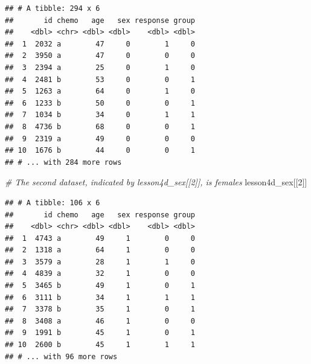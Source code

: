 \documentclass[]{book}
\newenvironment{Shaded}{\begin{snugshade}}{\end{snugshade}}
\newcommand{\CommentTok}[1]{\textcolor[rgb]{0.56,0.35,0.01}{\textit{#1}}}
\newcommand{\DataTypeTok}[1]{\textcolor[rgb]{0.13,0.29,0.53}{#1}}
\newcommand{\DecValTok}[1]{\textcolor[rgb]{0.00,0.00,0.81}{#1}}
\newcommand{\KeywordTok}[1]{\textcolor[rgb]{0.13,0.29,0.53}{\textbf{#1}}}
\newcommand{\NormalTok}[1]{#1}
\newcommand{\OperatorTok}[1]{\textcolor[rgb]{0.81,0.36,0.00}{\textbf{#1}}}
\begin{document}
\begin{verbatim}
## # A tibble: 294 x 6
##       id chemo   age   sex response group
##    <dbl> <chr> <dbl> <dbl>    <dbl> <dbl>
##  1  2032 a        47     0        1     0
##  2  3950 a        47     0        0     0
##  3  2394 a        25     0        1     0
##  4  2481 b        53     0        0     1
##  5  1263 a        64     0        1     0
##  6  1233 b        50     0        0     1
##  7  1034 b        34     0        1     1
##  8  4736 b        68     0        0     1
##  9  2319 a        49     0        0     0
## 10  1676 b        44     0        0     1
## # ... with 284 more rows
\end{verbatim}

\begin{Shaded}
\begin{Highlighting}[]
\CommentTok{# The second dataset, indicated by lesson4d_sex[[2]], is females}
\NormalTok{lesson4d_sex[[}\DecValTok{2}\NormalTok{]]}
\end{Highlighting}
\end{Shaded}

\begin{verbatim}
## # A tibble: 106 x 6
##       id chemo   age   sex response group
##    <dbl> <chr> <dbl> <dbl>    <dbl> <dbl>
##  1  4743 a        49     1        0     0
##  2  1318 a        64     1        0     0
##  3  3579 a        28     1        1     0
##  4  4839 a        32     1        0     0
##  5  3465 b        49     1        0     1
##  6  3111 b        34     1        1     1
##  7  3378 b        35     1        0     1
##  8  3408 a        46     1        0     0
##  9  1991 b        45     1        0     1
## 10  2600 b        45     1        1     1
## # ... with 96 more rows
\end{verbatim}

\begin{Shaded}
\end{Shaded}
\end{document}
